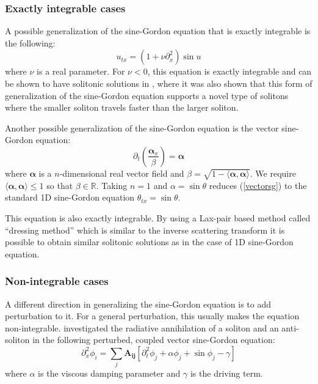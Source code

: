 \documentclass{report}
\begin{document}
\subsubsection{Exactly integrable cases}
A possible generalization of the sine-Gordon equation that is exactly integrable \cite{1751-8121-43-10-105204} is the following:
\begin{equation}
  u_{tx} = (1+\nu \partial^2_x)\sin u
\end{equation}
where $\nu$ is a real parameter. For $\nu<0$, this equation is exactly integrable and can be shown to have solitonic solutions in \cite{1751-8121-43-10-105204}, where it was also shown that this form of generalization of the sine-Gordon equation supports a novel type of solitons where the smaller soliton travels faster than the larger soliton.

\medbreak
Another possible generalization of the sine-Gordon equation is the vector sine-Gordon equation:
\begin{equation}\label{vectorsg}
  \partial_t\left(\frac{\bm{\alpha}_x}{\beta}\right) = \bm{\alpha}
\end{equation}
where $\bm{\alpha}$ is a $n$-dimensional real vector field and $\beta = \sqrt{1 - \langle\bm{\alpha},\bm{\alpha}\rangle}$. We require $\langle\bm{\alpha},\bm{\alpha}\rangle\le1$ so that $\beta\in\mathbb{R}$. Taking $n=1$ and $\alpha = \sin \theta$ reduces (\ref{vectorsg}) to the standard 1D sine-Gordon equation $\theta_{tx} = \sin \theta$.

This equation is also exactly integrable. By using a Lax-pair based method called ``dressing method'' which is similar to the inverse scattering transform \cite{Mikhailov201653} it is possible to obtain similar solitonic solutions as in the case of 1D sine-Gordon equation.

\subsubsection{Non-integrable cases}
A different direction in generalizing the sine-Gordon equation is to add perturbation to it. For a general perturbation, this usually makes the equation non-integrable. \cite{PhysRevB.85.134525} investigated the radiative annihilation of a soliton and an anti-soliton in the following perturbed, coupled vector sine-Gordon equation:
\begin{equation}
  \partial^2_x\phi_i=\sum_j \mathbf{A_{ij}} \left[\partial^2_t \phi_j +\alpha \phi_j +\sin \phi_j - \gamma\right]
\end{equation}
where $\alpha$ is the viscous damping parameter and $\gamma$ is the driving term.
\end{document}
